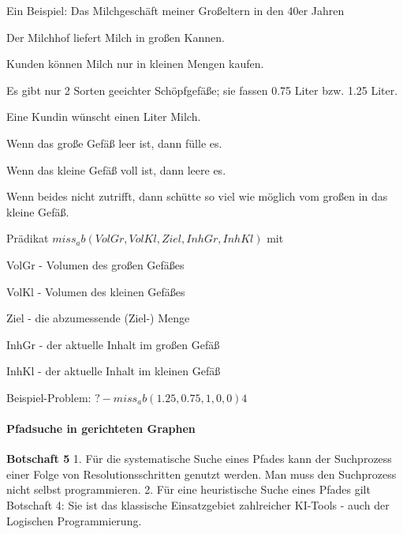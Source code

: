 \documentclass[a4paper]{article}
\renewcommand{\note}[2]{\begin{noteBox} \textbf{#1} #2 \end{noteBox}}
\begin{document}
\begin{multicols}{3}
  Ein Beispiel: Das Milchgeschäft meiner Großeltern in den 40er Jahren
  \begin{itemize*}
    \item Der Milchhof liefert Milch in großen Kannen.
    \item Kunden können Milch nur in kleinen Mengen kaufen.
    \item Es gibt nur 2 Sorten geeichter Schöpfgefäße; sie fassen 0.75 Liter bzw. 1.25 Liter.
    \item Eine Kundin wünscht einen Liter Milch.
  \end{itemize*}
  \begin{enumerate*}
    \item Wenn das große Gefäß leer ist, dann fülle es.
    \item Wenn das kleine Gefäß voll ist, dann leere es.
    \item Wenn beides nicht zutrifft, dann schütte so viel wie möglich vom großen in das kleine Gefäß.
  \end{enumerate*}

  Prädikat $miss_ab(VolGr, VolKl, Ziel, InhGr, InhKl)$ mit
  \begin{itemize*}
    \item VolGr -  Volumen des großen Gefäßes
    \item VolKl -  Volumen des kleinen Gefäßes
    \item Ziel - die abzumessende (Ziel-) Menge
    \item InhGr - der aktuelle Inhalt im großen Gefäß
    \item InhKl - der aktuelle Inhalt im kleinen Gefäß
  \end{itemize*}

  Beispiel-Problem: $?- miss_ab( 1.25 , 0.75 , 1 , 0 , 0 )4$

  \paragraph{Pfadsuche in gerichteten Graphen}
  \note{Botschaft  5}{
    1. Für die systematische Suche eines Pfades kann der Suchprozess einer Folge von Resolutionsschritten genutzt werden. Man muss den Suchprozess nicht selbst programmieren.
    2. Für eine heuristische Suche eines Pfades gilt Botschaft 4: Sie ist das klassische Einsatzgebiet zahlreicher KI-Tools - auch der Logischen Programmierung.
  }


\end{multicols}
\end{document}

